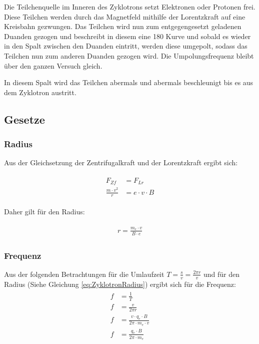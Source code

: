 Die Teilchenquelle im Inneren des Zyklotrons setzt Elektronen oder Protonen frei. Diese Teilchen werden durch das Magnetfeld mithilfe der Lorentzkraft auf eine Kreisbahn gezwungen. Das Teilchen wird nun zum entgegengesetzt geladenen Duanden gezogen und beschreibt in diesem eine 180\degree{} Kurve und sobald es wieder in den Spalt zwischen den Duanden eintritt, werden diese umgepolt, sodass das Teilchen nun zum anderen Duanden gezogen wird. Die Umpolungsfrequenz bleibt über den ganzen Versuch gleich. 

In diesem Spalt wird das Teilchen abermals und abermals beschleunigt bis es aus dem Zyklotron austritt.


\subsection{Gesetze}

\subsubsection{Radius}

Aus der Gleichsetzung der Zentrifugalkraft und der Lorentzkraft ergibt sich: 

\begin{align}
\begin{split}
	F_{Zf} &= F_{Lr} \\
	\frac{m \cdot v^2}{r} &= e \cdot v \cdot B
\end{split}
\end{align}

\noindent Daher gilt für den Radius:

\begin{align} \label{eq:ZyklotronRadius}
\begin{split}
	r = \frac{m_e \cdot v}{B \cdot e}
\end{split}
\end{align}


\subsubsection{Frequenz}

Aus der folgenden Betrachtungen für die Umlaufzeit $T = \frac{s}{v} = \frac{2 \pi r}{v}$ und für den Radius (Siehe Gleichung \ref{eq:ZyklotronRadius}) ergibt sich für die Frequenz: \\

\begin{align}
\begin{split}
	f &= \frac{1}{T} \\
	f &= \frac{v}{2 \pi r} \\
	f &= \frac{v \cdot q_e \cdot B}{2 \pi \cdot m_e \cdot v} \\
	f &= \frac{q_e \cdot B}{2 \pi \cdot m_e}
\end{split}
\end{align}






